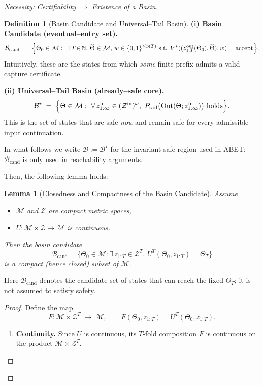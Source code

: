 \documentclass[12pt]{article}
\theoremstyle{definition}
\newtheorem{definition}{Definition}[section]
\theoremstyle{plain}
\newtheorem{lemma}{Lemma}[section]
\begin{document}
\begin{proof}[Necessity: Certifiability $\Rightarrow$ Existence of a Basin]
\begin{definition}[Basin Candidate and Universal–Tail Basin]
\medskip
\noindent\textbf{(i) Basin Candidate (eventual–entry set).}
\[
  \mathcal B_{\mathrm{cand}}
  \;=\;
  \Bigl\{
     \Theta_0\in\mathcal M:\ \exists\,T\!\in\!\mathbb N,\,\widehat\Theta\in\mathcal M,\,w\in\{0,1\}^{\le p(T)}
     \text{ s.t. }V^*((z^{\rm out}_{1:T}(\Theta_0),\widehat\Theta),w)=\mathrm{accept}
  \Bigr\}.
\]
Intuitively, these are the states from which \emph{some} finite prefix admits a valid capture certificate.

\medskip
\noindent\textbf{(ii) Universal–Tail Basin (already–safe core).}
\[
  \mathcal B^{\star}
  \;=\;
  \Bigl\{
     \Theta\in\mathcal M:\ \forall\,z^{\rm in}_{1:\infty}\in(\mathcal Z^{\rm in})^\omega,\ 
     P_{\rm tail}\bigl(\text{Out}(\Theta;z^{\rm in}_{1:\infty})\bigr)\text{ holds}
  \Bigr\}.
\]
This is the set of states that are safe \emph{now} and remain safe for every admissible input continuation.

\medskip
\noindent In what follows we write \(\mathcal B := \mathcal B^{\star}\) for the invariant safe region used in ABET; \(\mathcal B_{\mathrm{cand}}\) is only used in reachability arguments.
\end{definition}

Then, the following lemma holds:

\begin{lemma}[Closedness and Compactness of the Basin Candidate]\label{lem:basin-compact}
Assume
\begin{itemize}
  \item \(\mathcal M\) and \(\mathcal Z\) are compact metric spaces,
  \item \(U:\mathcal M\times\mathcal Z\to\mathcal M\) is continuous.
\end{itemize}
Then the basin candidate
\[
  \mathcal{B}_{\mathrm{cand}}
  =\{\Theta_{0}\in\mathcal M:\exists\,z_{1:T}\in\mathcal Z^T,\,
    U^T(\Theta_{0},z_{1:T})=\Theta_{T}\}
\]
is a compact (hence closed) subset of \(\mathcal M\).
\end{lemma}

Here $\mathcal{B}_{\mathrm{cand}}$ denotes the candidate set of states that can reach the fixed $\Theta_T$; it is not assumed to satisfy safety.

\begin{proof}
Define the map
\[
  F:\mathcal M \times \mathcal Z^T \;\longrightarrow\;\mathcal M,
  \qquad
  F(\Theta_{0},z_{1:T}) = U^T(\Theta_{0},z_{1:T}).
\]
\begin{enumerate}
  \item \textbf{Continuity.}  
    Since \(U\) is continuous, its \(T\)-fold composition \(F\) is continuous on the product \(\mathcal M\times\mathcal Z^T\).


\end{enumerate}
\end{proof}
\end{proof}
\end{document}
